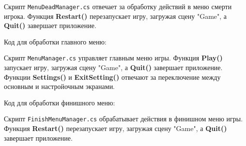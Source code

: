 Скрипт \texttt{MenuDeadManager.cs} отвечает за обработку действий
в меню смерти игрока. Функция \textbf{Restart()} перезапускает игру,
загружая сцену "Game", а \textbf{Quit()} завершает приложение.

Код для обработки главного меню:                                               


Скрипт \texttt{MenuManager.cs} управляет главным меню игры.
Функция \textbf{Play()} запускает игру, загружая сцену "Game",
а \textbf{Quit()} завершает приложение.
Функции \textbf{Settings()} и \textbf{ExitSetting()} отвечают
за переключение между основным и настройочным экранами.

Код для обработки финишного меню:                                              


Скрипт \texttt{FinishMenuManager.cs} обрабатывает действия
в финишном меню игры. Функция \textbf{Restart()} перезапускает игру,
загружая сцену "Game", а \textbf{Quit()} завершает приложение.

